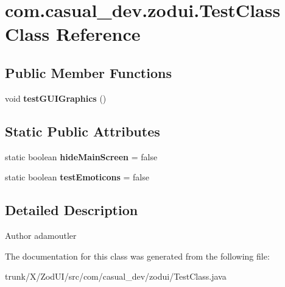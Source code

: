\hypertarget{classcom_1_1casual__dev_1_1zodui_1_1_test_class}{\section{com.\-casual\-\_\-dev.\-zodui.\-Test\-Class Class Reference}
\label{classcom_1_1casual__dev_1_1zodui_1_1_test_class}
}
\subsection*{Public Member Functions}
\begin{DoxyCompactItemize}
\item 
\hypertarget{classcom_1_1casual__dev_1_1zodui_1_1_test_class_a4cb84b5f0413840aa30fea70299098c8}{void {\bfseries test\-G\-U\-I\-Graphics} ()}\label{classcom_1_1casual__dev_1_1zodui_1_1_test_class_a4cb84b5f0413840aa30fea70299098c8}

\end{DoxyCompactItemize}
\subsection*{Static Public Attributes}
\begin{DoxyCompactItemize}
\item 
\hypertarget{classcom_1_1casual__dev_1_1zodui_1_1_test_class_a945b0d8b642607f3e0d12fa1e05d974a}{static boolean {\bfseries hide\-Main\-Screen} = false}\label{classcom_1_1casual__dev_1_1zodui_1_1_test_class_a945b0d8b642607f3e0d12fa1e05d974a}

\item 
\hypertarget{classcom_1_1casual__dev_1_1zodui_1_1_test_class_a436375379e3c4dca5b9f2675bb360c9a}{static boolean {\bfseries test\-Emoticons} = false}\label{classcom_1_1casual__dev_1_1zodui_1_1_test_class_a436375379e3c4dca5b9f2675bb360c9a}

\end{DoxyCompactItemize}


\subsection{Detailed Description}
\begin{DoxyAuthor}{Author}
adamoutler 
\end{DoxyAuthor}


The documentation for this class was generated from the following file\-:\begin{DoxyCompactItemize}
\item 
trunk/\-X/\-Zod\-U\-I/src/com/casual\-\_\-dev/zodui/Test\-Class.\-java\end{DoxyCompactItemize}

